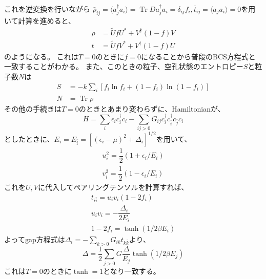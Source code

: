 \documentclass[a4paper,11pt]{jsreport}
\begin{document}
  これを逆変換を行いながら
  $\bar{\rho}_{ij}=\langle a_j^\dagger a_i\rangle=\operatorname{Tr}D a_j^\dagger a_i=\delta_{ij}f_i,
  \bar{t}_{ij}=\langle a_j a_i\rangle=0$を用いて計算を進めると、
  \begin{align}
    \rho &= \tilde{U}fU^{*} + V^{\dagger}(1-f)V \\
    t    &= \tilde{U}fV^{*} + V^{\dagger}(1-f)U
  \end{align}
  のようになる。
  これは$T=0$のときに$f=0$になることから普段のBCS方程式と一致することがわかる。
  また、このときの粒子、空孔状態のエントロピー$S$と粒子数$N$は
  \begin{align}
    S &= -k\sum_{i}\left[f_i\ln f_i + (1-f_i)\ln (1 - f_i)\right]\\
    N &= \operatorname{Tr}\rho
  \end{align}
  その他の手続きは$T=0$のときとあまり変わらずに、Hamiltonianが、
  \begin{equation}
    H=\sum_{i}\epsilon_ic_i^{\dagger}c_i-\sum_{ij>0}G_{ij}c_i^{\dagger}c_{\bar{i}}^{\dagger}c_{\bar{j}}c_i
  \end{equation}
  としたときに、$E_i=E_{\bar{i}}=[(\epsilon_i -\mu)^2 +\Delta_i]^{1/2}$を用いて、
  \begin{align}
    u_i^2 = \dfrac{1}{2}(1+\epsilon_i/E_i)\\
    v_i^2 = \dfrac{1}{2}(1-\epsilon_i/E_i)
  \end{align}
  これを$U,V$に代入してペアリングテンソルを計算すれば、
  \begin{align}
    t_{i\bar{i}}=u_iv_i(1-2f_i)\\
    u_iv_i=-\dfrac{\Delta_i}{2E_i}\\
    1-2f_i=\tanh(1/2\beta E_i)
  \end{align}
  よってgap方程式は$\Delta_i=-\sum_{k>0}G_{ik}t_{k\bar{k}}$より、
  \begin{equation}
    \Delta = \dfrac{1}{2}\sum_{j>0}G\dfrac{\Delta}{E_j} \tanh{(1/2\beta E_j)}
  \end{equation}
  これは$T=0$のときに$\tanh = 1$となり一致する。
\end{document}
